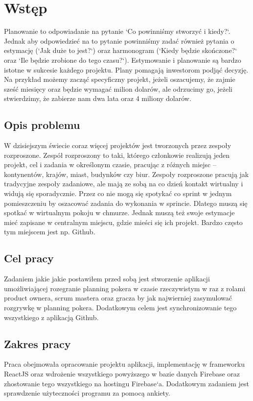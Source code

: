 \chapter*{Wstęp}

Planowanie to odpowiadanie na pytanie `Co powinniśmy stworzyć i kiedy?`. Jednak aby odpowiedzieć na to pytanie powinniśmy zadać również pytania o estymację (`Jak duże to jest?`) oraz harmonogram (`Kiedy będzie skończone?` oraz `Ile będzie zrobione do tego czasu?`). Estymowanie i planowanie są bardzo istotne w sukcesie każdego projektu. Plany pomagają inwestorom podjąć decyzję. Na przykład możemy zacząć specyficzny projekt, jeżeli oszacujemy, że zajmie sześć miesięcy oraz będzie wymagać milion dolarów, ale odrzucimy go, jeżeli stwierdzimy, że zabierze nam dwa lata oraz 4 miliony dolarów.\cite{Cohen_2006}

\section*{Opis problemu}

W dzisiejszym świecie coraz więcej projektów jest tworzonych przez zespoły rozproszone. Zespół rozproszony to taki, którego członkowie realizują jeden projekt, cel i zadania w określonym czasie, pracując z różnych miejsc – kontynentów, krajów, miast, budynków czy biur. Zespoły rozproszone pracują jak tradycyjne zespoły zadaniowe, ale mają ze sobą na co dzień kontakt wirtualny i widują się sporadycznie.\cite{www_rozproszony} Przez co nie mogą się spotykać co sprint w jednym pomieszczeniu by oszacować zadania do wykonania w sprincie. Dlatego muszą się spotkać w wirtualnym pokoju w chmurze. Jednak muszą też swoje estymacje mieć zapisane w centralnym miejscu, gdzie mieści się ich projekt. Bardzo często tym miejscem jest np. Github.

\section*{Cel pracy}

Zadaniem jakie jakie postawiłem przed sobą jest stworzenie aplikacji umożliwiającej rozegranie planning pokera w czasie rzeczywistym w raz z rolami product ownera, scrum mastera oraz gracza by jak najwierniej zasymulować rozgrywkę w planning pokera. Dodatkowym celem jest synchronizowanie tego wszystkiego z aplikacją Github.

\section*{Zakres pracy}

Praca obejmowała opracowanie projektu aplikacji, implementację w frameworku ReactJS oraz wdrożenie wszystkiego powyższego w bazie danych Firebase oraz zhostowanie tego wszystkiego na hostingu Firebase`a. Dodatkowym zadaniem jest sprawdzenie użyteczności programu za pomocą ankiety.
